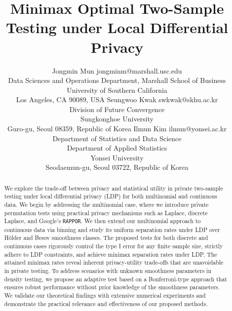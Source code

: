 \documentclass[twoside,11pt]{article}
\begin{document}
\title{Minimax Optimal Two-Sample Testing under Local Differential Privacy}

\author{\name Jongmin Mun \email jongminm@marshall.usc.edu \\
       \addr Data Sciences and Operations Department, Marshall School of Business\\
        University of Southern California\\
       Los Angeles, CA 90089, USA
       \AND
       \name  Seungwoo Kwak \email swkwak@skhu.ac.kr \\
       \addr Division of Future Convergence\\
       Sungkonghoe University\\
       Guro-gu, Seoul 08359, Republic of Korea
              \AND
       \name  Ilmun Kim \email ilmun@yonsei.ac.kr \\
       \addr Department of Statistics and Data Science\\
       Department of Applied Statistics       \\
       Yonsei University\\
       Seodaemun-gu, Seoul 03722, Republic of Korea
       }

\editor{}

\maketitle

\begin{abstract}%
We explore the trade-off between privacy and statistical utility in private two-sample testing under local differential privacy (LDP) for both multinomial and continuous data. We begin by addressing the multinomial case, where we introduce private permutation tests using practical privacy mechanisms such as Laplace, discrete Laplace, and Google's \texttt{RAPPOR}. We then extend our multinomial approach to continuous data via binning and study its uniform separation rates under LDP over H\"{o}lder and Besov smoothness classes. The proposed tests for both discrete and continuous cases rigorously control the type I error for any finite sample size, strictly adhere to LDP constraints, and achieve minimax separation rates under LDP. The attained minimax rates reveal inherent privacy-utility trade-offs that are unavoidable in private testing. To address scenarios with unknown smoothness parameters in density testing, we propose an adaptive test based on a Bonferroni-type approach that ensures robust performance without prior knowledge of the smoothness parameters. We validate our theoretical findings with extensive numerical experiments and demonstrate the practical relevance and effectiveness of our proposed methods.
\end{abstract}
\end{document}
